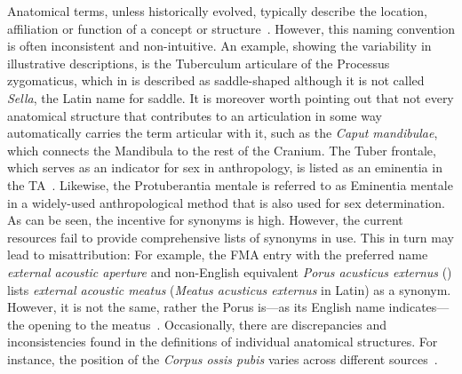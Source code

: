 \documentclass[sw]{iosart2x}
\newcommand{\latin}[1]{\emph{#1}}
\begin{document}
Anatomical terms, unless historically evolved, typically describe the location, affiliation or function of a concept or structure~\citep{reforminganatomical}.
However, this naming convention is often inconsistent and non-intuitive.
An example, showing the variability in illustrative descriptions, is the Tuberculum articulare of the Processus zygomaticus, which in \cite{anatomie} is described as saddle-shaped although it is not called \latin{Sella}, the Latin name for saddle.
It is moreover worth pointing out that not every anatomical structure that contributes to an articulation in some way automatically carries the term articular with it, such as the \latin{Caput mandibulae}, which connects the Mandibula to the rest of the Cranium.
The Tuber frontale, which serves as an indicator for sex in anthropology, is listed as an eminentia in the TA~\citep{ta2}.
Likewise, the Protuberantia mentale is referred to as Eminentia mentale in a widely-used anthropological method that is also used for sex determination.
As can be seen, the incentive for synonyms is high.
However, the current resources fail to provide comprehensive lists of synonyms in use.
This in turn may lead to misattribution: For example, the FMA entry with the preferred name \emph{external acoustic aperture} and non-English equivalent \latin{Porus acusticus externus} () lists \emph{external acoustic meatus} (\latin{Meatus acusticus externus} in Latin) as a synonym.
However, it is not the same, rather the Porus is---as its English name indicates---the opening to the meatus~\citep{anatomylexicon}.
Occasionally, there are discrepancies and inconsistencies found in the definitions of individual anatomical structures.
For instance, the position of the \latin{Corpus ossis pubis} varies across different sources~\citep{anatomylexicon,prometheus,allgemeineanatomie,dualereiheanatomie,anatomiedesmenschen}.
\end{document}
